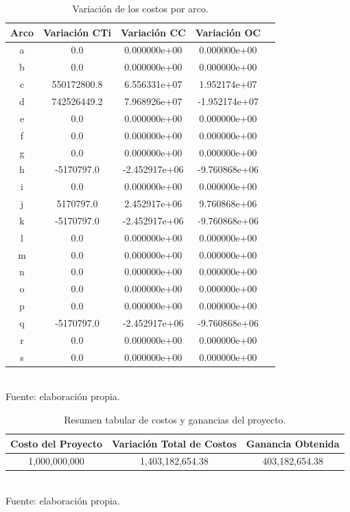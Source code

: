 \documentclass[letterpaper,12pt]{article}
\begin{document}
\begin{table}[H]
    \centering
    \caption{Variación de los costos por arco.}
    \begin{tabular}{ccccc}
        \toprule
        \textbf{Arco} & \textbf{Variación CTi} & \textbf{Variación CC} & \textbf{Variación OC} \\
        \midrule
        a & 0.0         & 0.000000e+00 & 0.000000e+00 \\
        b & 0.0         & 0.000000e+00 & 0.000000e+00 \\
        c & 550172800.8 & 6.556331e+07 & 1.952174e+07 \\
        d & 742526449.2 & 7.968926e+07 & -1.952174e+07 \\
        e & 0.0         & 0.000000e+00 & 0.000000e+00 \\
        f & 0.0         & 0.000000e+00 & 0.000000e+00 \\
        g & 0.0         & 0.000000e+00 & 0.000000e+00 \\
        h & -5170797.0  & -2.452917e+06 & -9.760868e+06 \\
        i & 0.0         & 0.000000e+00 & 0.000000e+00 \\
        j & 5170797.0   & 2.452917e+06 & 9.760868e+06 \\
        k & -5170797.0  & -2.452917e+06 & -9.760868e+06 \\
        l & 0.0         & 0.000000e+00 & 0.000000e+00 \\
        m & 0.0         & 0.000000e+00 & 0.000000e+00 \\
        n & 0.0         & 0.000000e+00 & 0.000000e+00 \\
        o & 0.0         & 0.000000e+00 & 0.000000e+00 \\
        p & 0.0         & 0.000000e+00 & 0.000000e+00 \\
        q & -5170797.0  & -2.452917e+06 & -9.760868e+06 \\
        r & 0.0         & 0.000000e+00 & 0.000000e+00 \\
        s & 0.0         & 0.000000e+00 & 0.000000e+00 \\
        \bottomrule
    \end{tabular}
    \\
    Fuente: elaboración propia.
    \label{tab:variacion_costos}
\end{table}


\begin{table}[H]
    \centering
    \caption{Resumen tabular de costos y ganancias del proyecto.}
    \begin{tabular}{ccc}
        \toprule
        \textbf{Costo del Proyecto} & \textbf{Variación Total de Costos} & \textbf{Ganancia Obtenida} \\
        \midrule
        1,000,000,000 & 1,403,182,654.38 & 403,182,654.38 \\
        \bottomrule
    \end{tabular}
    \\
    Fuente: elaboración propia.
    \label{tab:resumen_costos}
\end{table}
\end{document}
